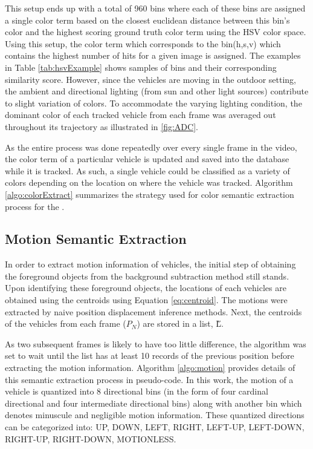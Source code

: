 This setup ends up with a total of 960 bins where each of these bins are assigned a single color term based on the closest euclidean distance between this bin's color and the highest scoring ground truth color term using the HSV color space. Using this setup, the color term which corresponds to the bin(h,s,v) which contains the highest number of hits for a given image is assigned. The examples in Table \ref{tab:hsvExample} shows samples of bins and their corresponding similarity score. However, since the vehicles are moving in the outdoor setting, the ambient and directional lighting (from sun and other light sources) contribute to slight variation of colors. To accommodate the varying lighting condition, the dominant color of each tracked vehicle from each frame was averaged out throughout its trajectory as illustrated in \ref{fig:ADC}. 


As the entire process was done repeatedly over every single frame in the video, the color term of a particular vehicle is updated and saved into the database while it is tracked. As such, a single vehicle could be classified as a variety of colors depending on the location on where the vehicle was tracked. Algorithm \ref{algo:colorExtract} summarizes the strategy used for color semantic extraction process for the \versionOne. 




\subsection{Motion Semantic Extraction}


In order to extract motion information of vehicles, the initial step of obtaining the foreground objects from the background subtraction method still stands. Upon identifying these foreground objects, the locations of each vehicles are obtained using the centroids using Equation \ref{eq:centroid}. The motions were extracted by naive position displacement inference methods. Next, the centroids of the vehicles from each frame ($P_N$) are stored in a list, \H{L}. 

As two subsequent frames is likely to have too little difference, the algorithm was set to wait until the list has at least 10 records of the previous position before extracting the motion information. Algorithm \ref{algo:motion} provides details of this semantic extraction process in pseudo-code. In this work, the motion of a vehicle is quantized into 8 directional bins (in the form of four cardinal directional and four intermediate directional bins) along with another bin which denotes minuscule and negligible motion information. These quantized directions can be categorized into: UP, DOWN, LEFT, RIGHT, LEFT-UP, LEFT-DOWN, RIGHT-UP, RIGHT-DOWN, MOTIONLESS. 

